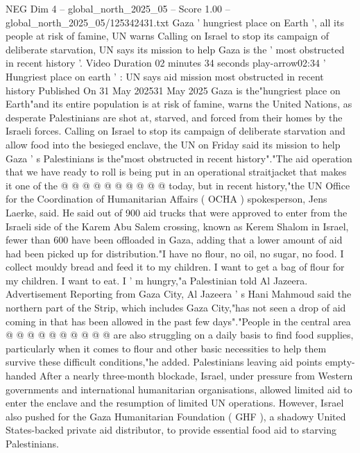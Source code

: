 \begin{textsample}{NEG Dim 4 – global\_north\_2025\_05 – Score 1.00 – global\_north\_2025\_05/125342431.txt}  \label{ex:f4_neg_247}
Gaza ' hungriest place on Earth ', all its people at risk of famine, UN warns Calling on Israel to stop its campaign of deliberate starvation, UN says its mission to help Gaza is the ' most obstructed in recent history '.
Video Duration 02 minutes 34 seconds play-arrow02:34 ' Hungriest place on earth ' : UN says aid mission most obstructed in recent history Published On 31 May 202531 May 2025 Gaza is the"hungriest place on Earth"and its entire population is at risk of famine, warns the United Nations, as desperate Palestinians are shot at, starved, and forced from their homes by the Israeli forces.
Calling on Israel to stop its campaign of deliberate starvation and allow food into the besieged enclave, the UN on Friday said its mission to help Gaza ' s Palestinians is the"most obstructed in recent history"."The aid operation that we have ready to roll is being put in an operational straitjacket that makes it one of the @ @ @ @ @ @ @ @ @ @ today, but in recent history,"the UN Office for the Coordination of Humanitarian Affairs ( OCHA ) spokesperson, Jens Laerke, said.
He said out of 900 aid trucks that were approved to enter from the Israeli side of the Karem Abu Salem crossing, known as Kerem Shalom in Israel, fewer than 600 have been offloaded in Gaza, adding that a lower amount of aid had been picked up for distribution."I have no flour, no oil, no sugar, no food.
I collect mouldy bread and feed it to my children.
I want to get a bag of flour for my children.
I want to eat.
I ' m hungry,"a Palestinian told Al Jazeera.
Advertisement Reporting from Gaza City, Al Jazeera ' s Hani Mahmoud said the northern part of the Strip, which includes Gaza City,"has not seen a drop of aid coming in that has been allowed in the past few days"."People in the central area @ @ @ @ @ @ @ @ @ @ are also struggling on a daily basis to find food supplies, particularly when it comes to flour and other basic necessities to help them survive these difficult conditions,"he added.
Palestinians leaving aid points empty-handed After a nearly three-month blockade, Israel, under pressure from Western governments and international humanitarian organisations, allowed limited aid to enter the enclave and the resumption of limited UN operations.
However, Israel also pushed for the Gaza Humanitarian Foundation ( GHF ), a shadowy United States-backed private aid distributor, to provide essential food aid to starving Palestinians.

\end{textsample}
